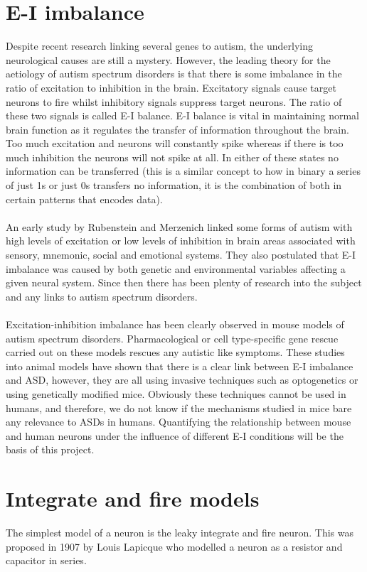 \documentclass{epsrc}
\begin{document}
\section{E-I imbalance}
\noindent
Despite recent research linking several genes to autism, the underlying neurological causes are still a mystery. However, the leading theory for the aetiology of autism spectrum disorders is that there is some imbalance in the ratio of excitation to inhibition in the brain. Excitatory signals cause target neurons to fire whilst inhibitory signals suppress target neurons. The ratio of these two signals is called E-I balance. E-I balance is vital in maintaining normal brain function as it regulates the transfer of information throughout the brain. Too much excitation and neurons will constantly spike whereas if there is too much inhibition the neurons will not spike at all. In either of these states no information can be transferred (this is a similar concept to how in binary a series of just 1s or just 0s transfers no information, it is the combination of both in certain patterns that encodes data).
\\\\
An early study by Rubenstein and Merzenich \cite{rubenstein2003model} linked some forms of autism with high levels of excitation or low levels of inhibition in brain areas associated with sensory, mnemonic, social and emotional systems. They also postulated that E-I imbalance was caused by both genetic and environmental variables affecting a given neural system. Since then there has been plenty of research into the subject and any links to autism spectrum disorders.
\\\\
Excitation-inhibition imbalance has been clearly observed in mouse models of autism spectrum disorders. Pharmacological or cell type-specific gene rescue carried out on these models rescues any autistic like symptoms. These studies into animal models have shown that there is a clear link between E-I imbalance and ASD, however, they are all using invasive techniques such as optogenetics or using genetically modified mice. Obviously these techniques cannot be used in humans, and therefore, we do not know if the mechanisms studied in mice bare any relevance to ASDs in humans. Quantifying the relationship between mouse and human neurons under the influence of different E-I conditions will be the basis of this project. 
\\
\section{Integrate and fire models}
\noindent
The simplest model of a neuron is the leaky integrate and fire neuron. This was proposed in 1907 by Louis Lapicque who modelled a neuron as a resistor and capacitor in series. 
\\
\end{document}
